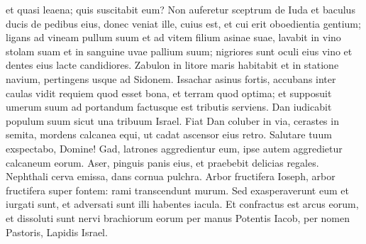 \begin{biblechapter}
\begin{biblechapter}
\begin{biblechapter}
\begin{biblechapter}
\begin{biblechapter}
\begin{biblechapter}
\begin{biblechapter}
\begin{biblechapter}
\begin{biblechapter}
\begin{biblechapter}
\begin{biblechapter}
\begin{biblechapter}
\begin{biblechapter}
\begin{biblechapter}
\begin{biblechapter}
\begin{biblechapter}
\begin{biblechapter}
\begin{biblechapter}
\begin{biblechapter}
\begin{biblechapter}
\begin{biblechapter}
\begin{biblechapter}
\begin{biblechapter}
\begin{biblechapter}
\begin{biblechapter}
\begin{biblechapter}
\begin{biblechapter}
\begin{biblechapter}
\begin{biblechapter}
\begin{biblechapter}
\begin{biblechapter}
\begin{biblechapter}
\begin{biblechapter}
\begin{biblechapter}
\begin{biblechapter}
\begin{biblechapter}
\begin{biblechapter}
\begin{biblechapter}
\begin{biblechapter}
\begin{biblechapter}
\begin{biblechapter}
\begin{biblechapter}
\begin{biblechapter}
\begin{biblechapter}
\begin{biblechapter}
\begin{biblechapter}
\begin{biblechapter}
\begin{biblechapter}
\begin{biblechapter}
 et quasi leaena; quis suscitabit eum?
 \verse Non auferetur sceptrum de Iuda
 et baculus ducis de pedibus eius,
 donec veniat ille, cuius est,
 et cui erit oboedientia gentium;
 \verse ligans ad vineam pullum suum
 et ad vitem filium asinae suae,
 lavabit in vino stolam suam
 et in sanguine uvae pallium suum; 
\verse nigriores sunt oculi eius vino
 et dentes eius lacte candidiores.
 \verse Zabulon in litore maris habitabit
 et in statione navium,
 pertingens usque ad Sidonem.
 \verse Issachar asinus fortis,
 accubans inter caulas
 \verse vidit requiem quod esset bona,
 et terram quod optima;
 et supposuit umerum suum ad portandum
 factusque est tributis serviens.
 \verse Dan iudicabit populum suum
 sicut una tribuum Israel.
 \verse Fiat Dan coluber in via,
 cerastes in semita,
 mordens calcanea equi,
 ut cadat ascensor eius retro.
 \verse Salutare tuum exspectabo, Domine!
 \verse Gad, latrones aggredientur eum,
 ipse autem aggredietur calcaneum eorum.
 \verse Aser, pinguis panis eius,
 et praebebit delicias regales.
 \verse Nephthali cerva emissa,
 dans cornua pulchra.
 \verse Arbor fructifera Ioseph,
 arbor fructifera super fontem:
 rami transcendunt murum.
 \verse Sed exasperaverunt eum et iurgati sunt,
 et adversati sunt illi habentes iacula.
 \verse Et confractus est arcus eorum,
 et dissoluti sunt nervi brachiorum eorum
 per manus Potentis Iacob,
 per nomen Pastoris, Lapidis Israel.

\end{biblechapter}
\end{biblechapter}
\end{biblechapter}
\end{biblechapter}
\end{biblechapter}
\end{biblechapter}
\end{biblechapter}
\end{biblechapter}
\end{biblechapter}
\end{biblechapter}
\end{biblechapter}
\end{biblechapter}
\end{biblechapter}
\end{biblechapter}
\end{biblechapter}
\end{biblechapter}
\end{biblechapter}
\end{biblechapter}
\end{biblechapter}
\end{biblechapter}
\end{biblechapter}
\end{biblechapter}
\end{biblechapter}
\end{biblechapter}
\end{biblechapter}
\end{biblechapter}
\end{biblechapter}
\end{biblechapter}
\end{biblechapter}
\end{biblechapter}
\end{biblechapter}
\end{biblechapter}
\end{biblechapter}
\end{biblechapter}
\end{biblechapter}
\end{biblechapter}
\end{biblechapter}
\end{biblechapter}
\end{biblechapter}
\end{biblechapter}
\end{biblechapter}
\end{biblechapter}
\end{biblechapter}
\end{biblechapter}
\end{biblechapter}
\end{biblechapter}
\end{biblechapter}
\end{biblechapter}
\end{biblechapter}
